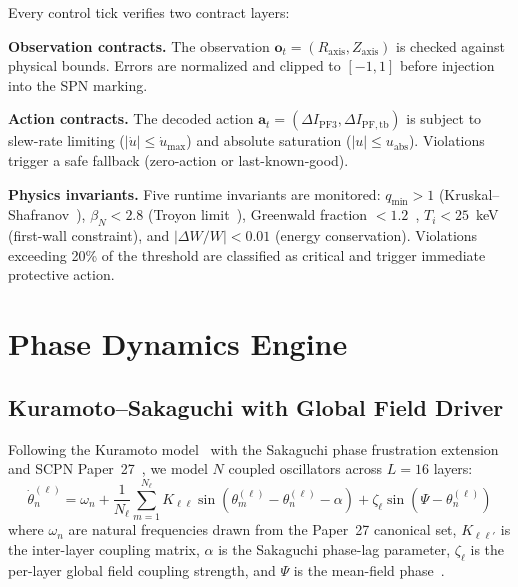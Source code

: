 \documentclass[twocolumn,preprintnumbers,amsmath,amssymb,prl,floatfix]{revtex4-2}
\begin{document}
Every control tick verifies two contract layers:

\textbf{Observation contracts.}\quad
The observation $\mathbf{o}_t = (R_\mathrm{axis}, Z_\mathrm{axis})$
is checked against physical bounds.  Errors are normalized and clipped
to $[-1, 1]$ before injection into the SPN marking.

\textbf{Action contracts.}\quad
The decoded action $\mathbf{a}_t = (\Delta I_\mathrm{PF3},
\Delta I_\mathrm{PF,tb})$ is subject to slew-rate limiting
($|\dot{u}| \leq \dot{u}_\mathrm{max}$) and absolute
saturation ($|u| \leq u_\mathrm{abs}$).
Violations trigger a safe fallback (zero-action or last-known-good).

\textbf{Physics invariants.}\quad
Five runtime invariants are monitored:
$q_\mathrm{min} > 1$ (Kruskal--Shafranov~\cite{freidberg2014}),
$\beta_N < 2.8$ (Troyon limit~\cite{troyon1984}),
Greenwald fraction $< 1.2$~\cite{greenwald2002},
$T_i < 25$~keV (first-wall constraint), and
$|\Delta W/W| < 0.01$ (energy conservation).
Violations exceeding 20\% of the threshold are classified as
critical and trigger immediate protective action.


\section{Phase Dynamics Engine}
\label{sec:phase}

\subsection{Kuramoto--Sakaguchi with Global Field Driver}

Following the Kuramoto model~\cite{kuramoto1975} with the
Sakaguchi phase frustration extension~\cite{sakaguchi1986}
and SCPN Paper~27~\cite{sotek2026knm}, we model $N$ coupled
oscillators across $L = 16$ layers:
%
\begin{equation}
  \dot{\theta}_n^{(\ell)} = \omega_n
  + \frac{1}{N_\ell} \sum_{m=1}^{N_\ell} K_{\ell\ell}
    \sin\!\left(\theta_m^{(\ell)} - \theta_n^{(\ell)} - \alpha\right)
  + \zeta_\ell \sin\!\left(\Psi - \theta_n^{(\ell)}\right)
  \label{eq:kuramoto}
\end{equation}
%
where $\omega_n$ are natural frequencies drawn from the Paper~27
canonical set, $K_{\ell\ell'}$ is the inter-layer coupling matrix,
$\alpha$ is the Sakaguchi phase-lag parameter,
$\zeta_\ell$ is the per-layer global field coupling strength, and
$\Psi$ is the mean-field phase~\cite{acebron2005}.
\end{document}
